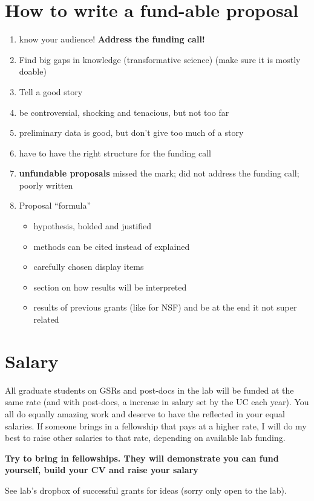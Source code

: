 \documentclass[12pt]{article}
\begin{document}
\section{How to write a fund-able proposal}

\begin{enumerate}
\item know your audience! \textbf{Address the funding call!}
\item Find big gaps in knowledge (transformative science) (make sure
  it is mostly doable)
\item Tell a good story
\item be controversial, shocking and tenacious, but not too far
\item preliminary data is good, but don't give too much of a story
\item have to have the right structure for the funding call
\item \textbf{unfundable proposals} missed the mark; did not address
  the funding call; poorly written
\item Proposal ``formula''
  \begin{itemize}
  \item hypothesis, bolded and justified
  \item methods can be cited instead of explained
  \item carefully chosen display items
  \item section on how results will be interpreted
  \item results of previous grants (like for NSF) and be at the end it
    not super related
  \end{itemize}
\end{enumerate}

\section{Salary}
All graduate students on GSRs and post-docs in the lab will be funded
at the same rate (and with post-docs, a increase in salary set by the
UC each year). You all do equally amazing work and deserve to have the
reflected in your equal salaries. If someone brings in a fellowship
that pays at a higher rate, I will do my best to raise other salaries
to that rate, depending on available lab funding.

\textbf{Try to bring in fellowships. They will demonstrate you can
  fund yourself, build your CV and raise your salary}

See lab's dropbox of successful grants for ideas (sorry only open to
the lab).
\end{document}
